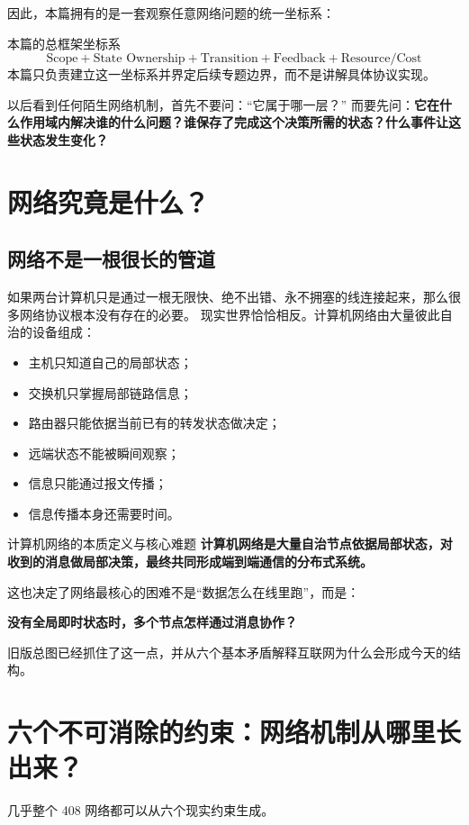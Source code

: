 \documentclass[11pt,a4paper,openany]{ctexbook}
\newcommand{\key}[1]{\textbf{\color{deep}#1}}
\begin{document}
因此，本篇拥有的是一套观察任意网络问题的统一坐标系：
\begin{corebox}{本篇的总框架坐标系}
\[
\text{Scope} + \text{State Ownership} + \text{Transition} + \text{Feedback} + \text{Resource/Cost}
\]
本篇只负责建立这一坐标系并界定后续专题边界，而不是讲解具体协议实现。
\end{corebox}

以后看到任何陌生网络机制，首先不要问：“它属于哪一层？”
而要先问：\key{它在什么作用域内解决谁的什么问题？谁保存了完成这个决策所需的状态？什么事件让这些状态发生变化？}

\section{网络究竟是什么？}
\subsection{网络不是一根很长的管道}
如果两台计算机只是通过一根无限快、绝不出错、永不拥塞的线连接起来，那么很多网络协议根本没有存在的必要。
现实世界恰恰相反。计算机网络由大量彼此自治的设备组成：
\begin{itemize}
    \item 主机只知道自己的局部状态；
    \item 交换机只掌握局部链路信息；
    \item 路由器只能依据当前已有的转发状态做决定；
    \item 远端状态不能被瞬间观察；
    \item 信息只能通过报文传播；
    \item 信息传播本身还需要时间。
\end{itemize}

\begin{corebox}{计算机网络的本质定义与核心难题}
\textbf{计算机网络是大量自治节点依据局部状态，对收到的消息做局部决策，最终共同形成端到端通信的分布式系统。}

这也决定了网络最核心的困难不是“数据怎么在线里跑”，而是：
\begin{center}
\key{没有全局即时状态时，多个节点怎样通过消息协作？}
\end{center}
\end{corebox}
旧版总图已经抓住了这一点，并从六个基本矛盾解释互联网为什么会形成今天的结构。

\section{六个不可消除的约束：网络机制从哪里长出来？}
几乎整个 408 网络都可以从六个现实约束生成。
\end{document}
